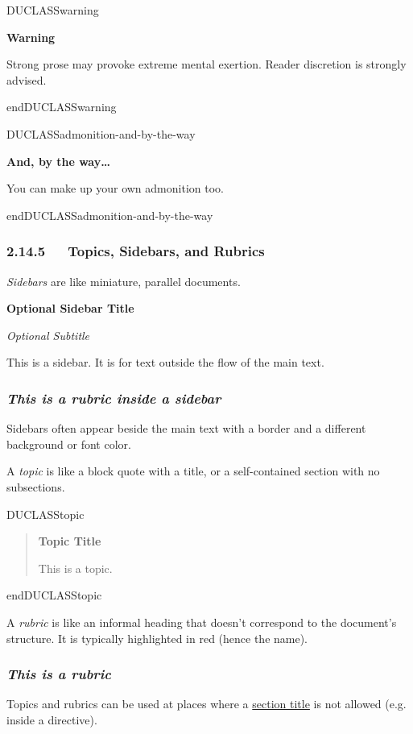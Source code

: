 \documentclass[a4paper]{article}
\newenvironment{DUclass}[1]%
    {%
     \def\DocutilsClassFunctionName{DUCLASS#1}
     \csname \DocutilsClassFunctionName \endcsname}%
    {\csname end\DocutilsClassFunctionName \endcsname}%
\newenvironment{DUadmonition}%
    {\begin{center}
       \begin{lrbox}{\DUadmonitionbox}
         \begin{minipage}{0.9\linewidth}
    }%
    {    \end{minipage}
       \end{lrbox}
       \fbox{\usebox{\DUadmonitionbox}}
     \end{center}
    }
\providecommand*{\DUrubric}[1]{\subsubsection*{\emph{#1}}}
\providecommand{\DUsidebar}[1]{%
  \begin{center}
    \colorbox[gray]{0.80}{\parbox{0.9\linewidth}{#1}}
  \end{center}
}
\providecommand*{\DUsubtitle}[1]{\par\emph{#1}\smallskip}
\providecommand*{\DUtitle}[1]{%
  \smallskip\noindent\textbf{#1}\smallskip}
\begin{document}
\begin{DUclass}{warning}
\begin{DUadmonition}
\DUtitle{Warning}

Strong prose may provoke extreme mental exertion.
Reader discretion is strongly advised.
\end{DUadmonition}
\end{DUclass}

\begin{DUclass}{admonition-and-by-the-way}
\begin{DUadmonition}
\DUtitle{And, by the way…}

You can make up your own admonition too.
\end{DUadmonition}
\end{DUclass}


\subsubsection{2.14.5   Topics, Sidebars, and Rubrics%
  \label{topics-sidebars-and-rubrics}%
}

\emph{Sidebars} are like miniature, parallel documents.

\DUsidebar{
\DUtitle{Optional Sidebar Title}

\DUsubtitle{Optional Subtitle}

This is a sidebar.  It is for text outside the flow of the main
text.

\DUrubric{This is a rubric inside a sidebar}

Sidebars often appear beside the main text with a border and a different
background or font color.
}

A \emph{topic} is like a block quote with a title, or a self-contained section
with no subsections.

\begin{DUclass}{topic}
\begin{quote}
\DUtitle{Topic Title}

This is a topic.
\end{quote}
\end{DUclass}

A \emph{rubric} is like an informal heading that doesn’t correspond to the
document’s structure. It is typically highlighted in red (hence the name).

\DUrubric{This is a rubric}

Topics and rubrics can be used at places where a \hyperref[section-title]{section title} is not
allowed (e.g. inside a directive).
\end{document}
